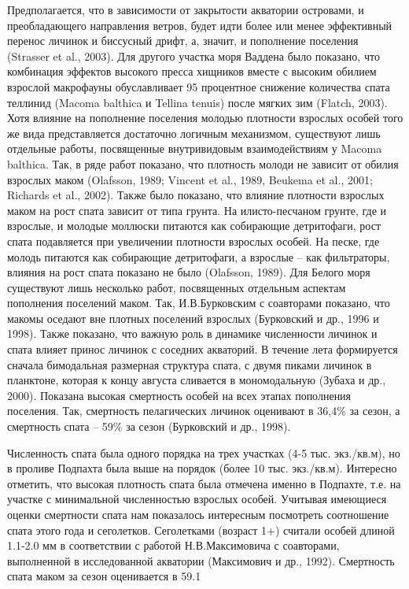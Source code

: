 Предполагается, что в зависимости от закрытости акватории островами, и преобладающего направления ветров, будет идти более или менее эффективный перенос личинок и биссусный дрифт, а, значит, и пополнение поселения (Strasser et al., 2003).
Для другого участка моря Ваддена было показано, что комбинация эффектов высокого пресса хищников вместе с высоким обилием взрослой макрофауны обуславливает 95 процентное снижение количества спата теллинид (Macoma balthica и Tellina tenuis) после мягких зим (Flatch, 2003). 
Хотя влияние на пополнение поселения молодью плотности взрослых особей того же вида представляется достаточно логичным механизмом, существуют лишь отдельные работы, посвященные внутривидовым взаимодействиям у Macoma balthica. Так, в ряде работ показано, что плотность молоди не зависит от обилия взрослых маком (Olafsson, 1989; Vincent et al., 1989, Beukema et al., 2001; Richards et al., 2002). 
 Также было показано, что влияние плотности взрослых маком на рост спата зависит от типа грунта. На илисто-песчаном грунте, где и взрослые, и молодые моллюски питаются как собирающие детритофаги, рост спата подавляется при увеличении плотности взрослых особей. На песке, где молодь питаются как собирающие детритофаги, а взрослые – как фильтраторы, влияния на рост спата показано не было (Olafsson, 1989). 
Для Белого моря существуют лишь несколько работ, посвященных отдельным аспектам пополнения поселений маком. Так, И.В.Бурковским с соавторами показано, что макомы оседают вне плотных поселений взрослых (Бурковский и др., 1996 и 1998). Также показано, что важную роль в динамике численности личинок и спата влияет принос личинок с соседних акваторий. В течение лета формируется сначала бимодальная размерная структура спата, с двумя пиками личинок в планктоне, которая к концу августа сливается в мономодальную (Зубаха и др., 2000). 
Показана высокая смертность особей на всех этапах пополнения поселения. Так, смертность пелагических личинок оценивают в 36,4\% за сезон, а смертность спата – 59\% за сезон (Бурковский и др., 1998).

Численность спата была одного порядка на трех участках (4-5 тыс. экз./кв.м), но в проливе Подпахта была выше на порядок (более 10 тыс. экз./кв.м). Интересно отметить, что высокая плотность спата была отмечена именно в Подпахте, т.е. на участке с минимальной численностью взрослых особей. 
Учитывая имеющиеся оценки смертности спата нам показалось интересным посмотреть соотношение спата этого года и сеголетков. Сеголетками (возраст 1+) считали особей длиной 1.1-2.0 мм в соответствии с работой Н.В.Максимовича с соавторами, выполненной в исследованной акватории (Максимович и др., 1992). Смертность спата маком за сезон оценивается в 59.1%

